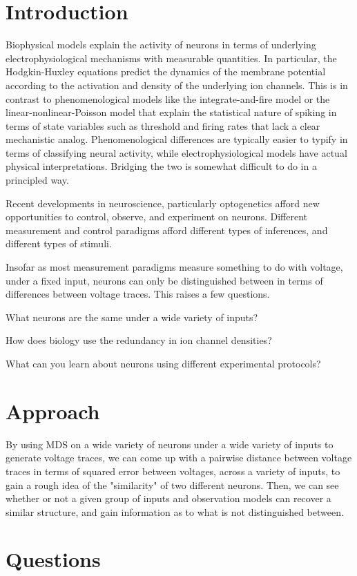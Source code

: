 \documentclass{report}
\begin{document}
\section{Introduction} 
Biophysical models explain the activity of neurons in terms of underlying electrophysiological mechanisms with measurable quantities. In particular, the Hodgkin-Huxley equations predict the dynamics of the membrane potential according to the activation and density of the underlying ion channels. This is in contrast to phenomenological models like the integrate-and-fire model or the linear-nonlinear-Poisson model that explain the statistical nature of spiking in terms of state variables such as threshold and firing rates that lack a clear mechanistic analog. Phenomenological differences are typically easier to typify in terms of classifying neural activity, while electrophysiological models have actual physical interpretations. Bridging the two is somewhat difficult to do in a principled way.

Recent developments in neuroscience, particularly optogenetics afford new opportunities to control, observe, and experiment on neurons. Different measurement and control paradigms afford different types of inferences, and different types of stimuli.

Insofar as most measurement paradigms measure something to do with voltage, under a fixed input, neurons can only be distinguished between in terms of differences between voltage traces. This raises a few questions.

What neurons are the same under a wide variety of inputs? 

How does biology use the redundancy in ion channel densities?

What can you learn about neurons using different experimental protocols?


\section{Approach}
By using MDS on a wide variety of neurons under a wide variety of inputs to generate voltage traces, we can come up with a pairwise distance between voltage traces in terms of squared error between voltages, across a variety of inputs, to gain a rough idea of the "similarity" of two different neurons. Then, we can see whether or not a given group of inputs and observation models can recover a similar structure, and gain information as to what is not distinguished between.

\section{Questions}
\end{document}
